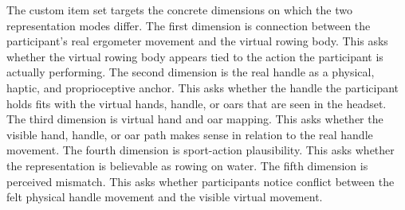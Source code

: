 The custom item set targets the concrete dimensions on which the two representation modes differ.
The first dimension is connection between the participant's real ergometer movement and the virtual rowing body.
This asks whether the virtual rowing body appears tied to the action the participant is actually performing.
The second dimension is the real handle as a physical, haptic, and proprioceptive anchor.
This asks whether the handle the participant holds fits with the virtual hands, handle, or oars that are seen in the headset.
The third dimension is virtual hand and oar mapping.
This asks whether the visible hand, handle, or oar path makes sense in relation to the real handle movement.
The fourth dimension is sport-action plausibility.
This asks whether the representation is believable as rowing on water.
The fifth dimension is perceived mismatch.
This asks whether participants notice conflict between the felt physical handle movement and the visible virtual movement.


